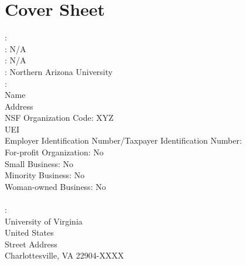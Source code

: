 
\section{Cover Sheet}

\noindent {}: 
\\

\noindent {}: N/A
\\

\noindent {}: N/A
\\

\noindent {}: Northern Arizona University
\\

\noindent {}:    \\
\hspace{1in}Name \\
\hspace{1in}Address \\
\hspace{1in}NSF Organization Code: XYZ \\
\hspace{1in}UEI \\
\hspace{1in}Employer Identification Number/Taxpayer Identification Number:  \\
\hspace{1in}For-profit Organization: No\\
\hspace{1in}Small Business: No\\
\hspace{1in}Minority Business: No\\
\hspace{1in}Woman-owned Business: No\\
\\

\noindent {}:    \\
\hspace{1in}University of Virginia \\
\hspace{1in}United States \\
\hspace{1in}Street Address\\
\hspace{1in}Charlottesville, VA 22904-XXXX\\
\\

